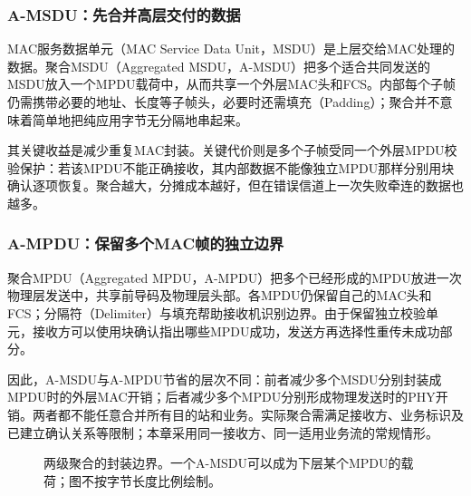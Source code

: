 \subsubsection{A-MSDU：先合并高层交付的数据}

MAC服务数据单元（MAC Service Data Unit，MSDU）是上层交给MAC处理的数据。聚合MSDU（Aggregated MSDU，A-MSDU）把多个适合共同发送的MSDU放入一个MPDU载荷中，从而共享一个外层MAC头和FCS。内部每个子帧仍需携带必要的地址、长度等子帧头，必要时还需填充（Padding）；聚合并不意味着简单地把纯应用字节无分隔地串起来。

其关键收益是减少重复MAC封装。关键代价则是多个子帧受同一个外层MPDU校验保护：若该MPDU不能正确接收，其内部数据不能像独立MPDU那样分别用块确认逐项恢复。聚合越大，分摊成本越好，但在错误信道上一次失败牵连的数据也越多。

\subsubsection{A-MPDU：保留多个MAC帧的独立边界}

聚合MPDU（Aggregated MPDU，A-MPDU）把多个已经形成的MPDU放进一次物理层发送中，共享前导码及物理层头部。各MPDU仍保留自己的MAC头和FCS；分隔符（Delimiter）与填充帮助接收机识别边界。由于保留独立校验单元，接收方可以使用块确认指出哪些MPDU成功，发送方再选择性重传未成功部分。

因此，A-MSDU与A-MPDU节省的层次不同：前者减少多个MSDU分别封装成MPDU时的外层MAC开销；后者减少多个MPDU分别形成物理发送时的PHY开销。两者都不能任意合并所有目的站和业务。实际聚合需满足接收方、业务标识及已建立确认关系等限制；本章采用同一接收方、同一适用业务流的常规情形。

\begin{figure}[htbp]
\centering
{}
\caption{两级聚合的封装边界。一个A-MSDU可以成为下层某个MPDU的载荷；图不按字节长度比例绘制。}
\end{figure}

